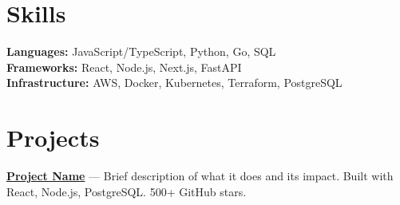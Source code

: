 \documentclass[11pt,a4paper]{article}
\begin{document}
\section{Skills}

\textbf{Languages:} JavaScript/TypeScript, Python, Go, SQL\\
\textbf{Frameworks:} React, Node.js, Next.js, FastAPI\\
\textbf{Infrastructure:} AWS, Docker, Kubernetes, Terraform, PostgreSQL

\section{Projects}

\textbf{\href{https://github.com/username/project}{Project Name}} — Brief description of what it does and its impact. Built with React, Node.js, PostgreSQL. 500+ GitHub stars.
\end{document}
